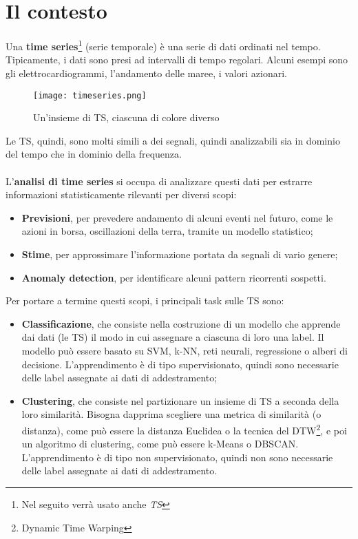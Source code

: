 \section{Il contesto}
Una \textbf{time series}\footnote{Nel seguito verrà usato anche \textit{TS}} (serie temporale) è una serie di dati ordinati nel tempo. Tipicamente, i dati sono presi ad intervalli di tempo regolari. Alcuni esempi sono gli elettrocardiogrammi, l'andamento delle maree, i valori azionari.
\begin{figure}[H]
	\centering
	\texttt{[image: timeseries.png]}
	\caption{Un'insieme di TS, ciascuna di colore diverso}
	\label{fig:timeseries}
\end{figure}
Le TS, quindi, sono molti simili a dei segnali, quindi analizzabili sia in dominio del tempo che in dominio della frequenza.\\
\\
L'\textbf{analisi di time series} si occupa di analizzare questi dati per estrarre informazioni statisticamente rilevanti per diversi scopi:
\begin{itemize}
	\item \textbf{Previsioni}, per prevedere andamento di alcuni eventi nel futuro, come le azioni in borsa, oscillazioni della terra, tramite un modello statistico;
	\item \textbf{Stime}, per approssimare l'informazione portata da segnali di vario genere;
	\item \textbf{Anomaly detection}, per identificare alcuni pattern ricorrenti sospetti.
\end{itemize}
Per portare a termine questi scopi, i principali task sulle TS sono:
\begin{itemize}
	\item \textbf{Classificazione}, che consiste nella costruzione di un modello che apprende dai dati (le TS) il modo in cui assegnare a ciascuna di loro una label. Il modello può essere basato su SVM, k-NN, reti neurali, regressione o alberi di decisione. L'apprendimento è di tipo supervisionato, quindi sono necessarie delle label assegnate ai dati di addestramento;
	\item \textbf{Clustering}, che consiste nel partizionare un insieme di TS a seconda della loro similarità. Bisogna dapprima scegliere una metrica di similarità (o distanza), come può essere la distanza Euclidea o la tecnica del DTW\footnote{Dynamic Time Warping}, e poi un algoritmo di clustering, come può essere k-Means o DBSCAN. L'apprendimento è di tipo non supervisionato, quindi non sono necessarie delle label assegnate ai dati di addestramento.
\end{itemize}
